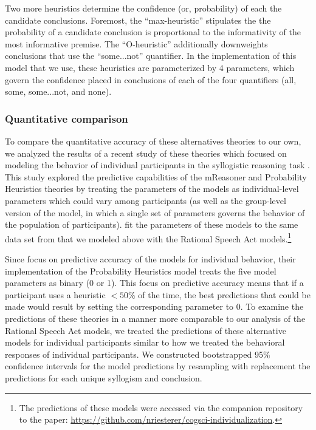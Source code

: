 \documentclass[floatsintext, doc]{apa6}
\begin{document}
Two more heuristics determine the confidence (or, probability) of each the candidate conclusions. 
Foremost, the ``max-heuristic'' stipulates the the probability of a candidate conclusion is proportional to the informativity of the most informative premise.
The ``O-heuristic'' additionally downweights conclusions that use the ``some...not'' quantifier.
In the implementation of this model that we use, these heuristics are parameterized by 4 parameters, which govern the confidence placed in conclusions of each of the four quantifiers (all, some, some...not, and none).

\subsubsection{Quantitative comparison}

To compare the quantitative accuracy of these alternatives theories to our own, we analyzed the results of a recent study of these theories which focused on modeling the behavior of individual participants in the syllogistic reasoning task \cite{riesterer2020models}.
This study explored the predictive capabilities of the mReasoner and Probability Heuristics theories by treating the parameters of the models as individual-level parameters which could vary among participants (as well as the group-level version of the model, in which a single set of parameters governs the behavior of the population of participants).
 fit the parameters of these models to the same data set from  that we modeled above with the Rational Speech Act models.\footnote{The predictions of these models were accessed via the companion repository to the paper: \url{https://github.com/nriesterer/cogsci-individualization}.}

Since  focus on predictive accuracy of the models for individual behavior, their implementation of the Probability Heuristics model treats the five model parameters as binary (0 or 1). This focus on predictive accuracy means that if a participant uses a heuristic $<50\%$ of the time, the best predictions that could be made would result by setting the corresponding parameter to 0. 
To examine the predictions of these theories in a manner more comparable to our analysis of the Rational Speech Act models, we treated the predictions of these alternative models for individual participants similar to how we treated the behavioral responses of individual participants. 
We constructed bootstrapped 95\% confidence intervals for the model predictions by resampling with replacement the predictions for each unique syllogism and conclusion. 
\end{document}
